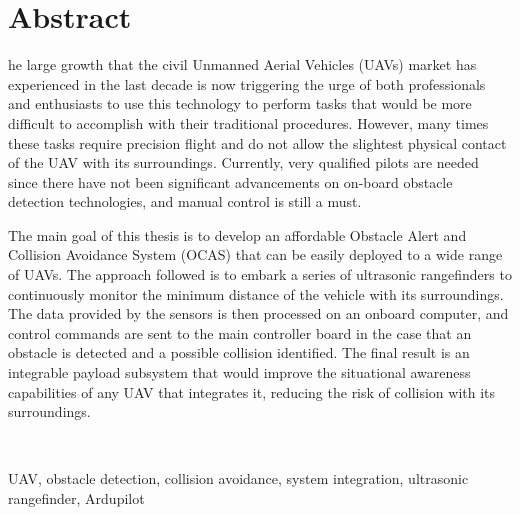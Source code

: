 %
%
%

\chapter*{Abstract}
\begin{SingleSpace}
he large growth that the civil Unmanned Aerial Vehicles (UAVs) market has experienced in the last decade is now triggering the urge of both professionals and enthusiasts to use this technology to perform tasks that would be more difficult to accomplish with their traditional procedures.
However, many times these tasks require precision flight and do not allow the slightest physical contact of the UAV with its surroundings. 
Currently, very qualified pilots are needed since there have not been significant advancements on on-board obstacle detection technologies, and manual control is still a must.

The main goal of this thesis is to develop an affordable Obstacle Alert and Collision Avoidance System (OCAS) that can be easily deployed to a wide range of UAVs.
The approach followed is to embark a series of ultrasonic rangefinders to continuously monitor the minimum distance of the vehicle with its surroundings.
The data provided by the sensors is then processed on an onboard computer, and control commands are sent to the main controller board in the case that an obstacle is detected and a possible collision identified.
The final result is an integrable payload subsystem that would improve the situational awareness capabilities of any UAV that integrates it, reducing the risk of collision with its surroundings.
\end{SingleSpace}
~\\
\begin{keywords}
	UAV, obstacle detection, collision avoidance, system integration, ultrasonic rangefinder, Ardupilot
\end{keywords}
\clearpage
